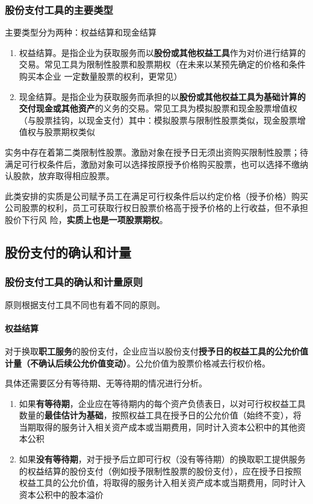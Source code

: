 \documentclass[UTF8,12pt]{ctexart}
\numberwithin{equation}{section} %
\numberwithin{figure}{section}
\numberwithin{table}{section}
\begin{document}
	
	\subsubsection{股份支付工具的主要类型}
	
	主要类型分为两种：权益结算和现金结算
	\begin{enumerate}
		\item 权益结算。是指企业为获取服务而以\textbf{股份或其他权益工具}作为对价进行结算的交易。常见工具为限制性股票和股票期权（在未来以某预先确定的价格和条件购买本企业  一定数量股票的权利，更常见）
		
		\item 现金结算。是指企业为获取服务而承担的以\textbf{股份或其他权益工具为基础计算的交付现金或其他资产}的义务的交易。常见工具为模拟股票和现金股票增值权（与股票挂钩，以现金支付）其中：模拟股票与限制性股票类似，现金股票增值权与股票期权类似
		
	\end{enumerate}
	
	实务中存在着第二类限制性股票。激励对象在授予日无须出资购买限制性股票；待满足可行权条件后，激励对象可以选择按原授予价格购买股票，也可以选择不缴纳认股款，放弃取得相应股票。
	
	此类安排的实质是公司赋予员工在满足可行权条件后以约定价格（授予价格）购买公司股票的权利，员工可获取行权日股票价格高于授予价格的上行收益，但不承担股价下行风 险，\textbf{实质上也是一项股票期权}。
	
	
	\subsection{股份支付的确认和计量}
	
	\subsubsection{股份支付工具的确认和计量原则}
	原则根据支付工具不同也有着不同的原则。
	
	\paragraph{权益结算}对于换取\textbf{职工服务}的股份支付，企业应当以股份支付\textbf{授予日的权益工具的公允价值计量（不确认后续公允价值变动）}。公允价值为股票价格减去行权价格。
	
	具体还需要区分有等待期、无等待期的情况进行分析。
	
	\begin{enumerate}
		\item 如果\textbf{有等待期}，企业应在等待期内的每个资产负债表日，以对可行权权益工具数量的\textbf{最佳估计为基础}，按照权益工具在授予日的公允价值（始终不变），将当期取得的服务计入相关资产成本或当期费用，同时计入资本公积中的其他资本公积
		
		\item 如果\textbf{没有等待期}，对于授予后立即可行权（没有等待期）的换取职工提供服务的权益结算的股份支付（例如授予限制性股票的股份支付），应在授予日按照权益工具的公允价值，将取得的服务计入相关资产成本或当期费用，同时计入资本公积中的股本溢价
	\end{enumerate}
	
\end{document}
